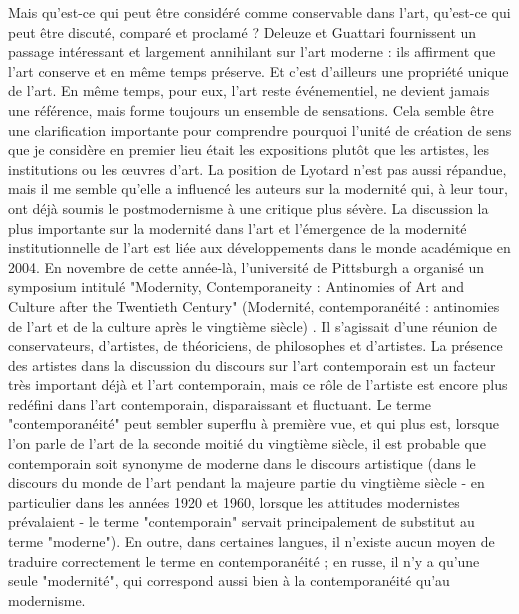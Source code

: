 \documentclass[a4paper, twoside, 12pt]{book}
\begin{document}
Mais qu'est-ce qui peut être considéré comme conservable dans l'art, qu'est-ce qui peut être discuté, comparé et proclamé ? Deleuze et Guattari fournissent un passage intéressant et largement annihilant sur l'art moderne : ils affirment que l'art conserve et en même temps préserve. Et c'est d'ailleurs une propriété unique de l'art. En même temps, pour eux, l'art reste événementiel, ne devient jamais une référence, mais forme toujours un ensemble de sensations. Cela semble être une clarification importante pour comprendre pourquoi l'unité de création de sens que je considère en premier lieu était les expositions plutôt que les artistes, les institutions ou les œuvres d'art. La position de Lyotard n'est pas aussi répandue, mais il me semble qu'elle a influencé les auteurs sur la modernité qui, à leur tour, ont déjà soumis le postmodernisme à une critique plus sévère. 
La discussion la plus importante sur la modernité dans l'art et l'émergence de la modernité institutionnelle de l'art est liée aux développements dans le monde académique en 2004. En novembre de cette année-là, l'université de Pittsburgh a organisé un symposium intitulé "Modernity, Contemporaneity : Antinomies of Art and Culture after the Twentieth Century" (Modernité, contemporanéité : antinomies de l'art et de la culture après le vingtième siècle) . Il s'agissait d'une réunion de conservateurs, d'artistes, de théoriciens, de philosophes et d'artistes. La présence des artistes dans la discussion du discours sur l'art contemporain est un facteur très important déjà et l'art contemporain, mais ce rôle de l'artiste est encore plus redéfini dans l'art contemporain, disparaissant et fluctuant. Le terme "contemporanéité" peut sembler superflu à première vue, et qui plus est, lorsque l'on parle de l'art de la seconde moitié du vingtième siècle, il est probable que contemporain soit synonyme de moderne dans le discours artistique (dans le discours du monde de l'art pendant la majeure partie du vingtième siècle - en particulier dans les années 1920 et 1960, lorsque les attitudes modernistes prévalaient - le terme "contemporain" servait principalement de substitut au terme "moderne"). En outre, dans certaines langues, il n'existe aucun moyen de traduire correctement le terme en contemporanéité ; en russe, il n'y a qu'une seule "modernité", qui correspond aussi bien à la contemporanéité qu'au modernisme. 
\end{document}
